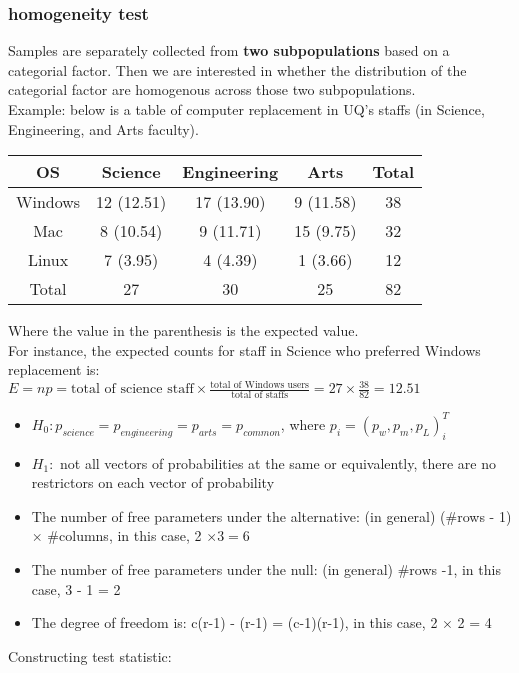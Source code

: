 \documentclass[12pt ]{article}
\begin{document}
\subsubsection{homogeneity test}
Samples are separately collected from \textbf{two subpopulations} based on a categorial factor. Then we are interested in whether the distribution of the categorial factor are homogenous across those two subpopulations.\\

Example: below is a table of computer replacement in UQ's staffs (in Science, Engineering, and Arts faculty).
\begin{center}
\begin{tabular}{||c | c | c | c | c||} 
 \hline
 OS & Science & Engineering &  Arts & Total\\ [0.5ex] 
 \hline\hline
Windows & 12 (12.51) & 17 (13.90) & 9  (11.58) & 38 \\ 
Mac & 8 (10.54) & 9 (11.71) & 15 (9.75) & 32\\  
Linux & 7 (3.95) & 4 (4.39) & 1 (3.66) & 12\\
\hline
Total & 27 & 30 & 25 & 82\\
 \hline
\end{tabular}
\end{center}
Where the value in the parenthesis is the expected value. \\
For instance, the expected counts for staff in Science who preferred Windows replacement is: $E = np = \text{total of science staff} \times \frac{\text{total of Windows users}}{\text{total of staffs}} = 27 \times \frac{38}{82} = 12.51$ \\
\begin{itemize}
\item $H_{0}: p_{science} = p_{engineering} = p_{arts} = p_{common}$, where $p_{i} = (p_{w}, p_{m}, p_{L})^T_{i}$
\item $H_{1}: $ not all vectors of probabilities at the same or equivalently, there are no restrictors on each vector of probability 
\item The number of free parameters under the alternative: (in general) (\#rows - 1) $\times$ \#columns, in this case, 2 $\times 3 = 6$
\item The number of free parameters under the null: (in general) \#rows -1, in this case, 3 - 1 = 2
\item The degree of freedom is: c(r-1) - (r-1) = (c-1)(r-1), in this case, 2 $\times$ 2 = 4
\end{itemize} 
Constructing test statistic:
\end{document}
